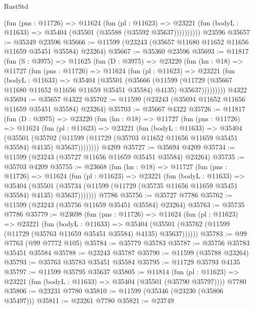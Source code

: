 \begin{lexlean}{RustStd}
\begin{coremodule}
            (fun (pns : @11726) =>
            @11624
              (fun (pl : @11623) =>
              @23221 (fun (bodyL : @11633) => @35404 (@35501 (@35588 (@35592 @35637))))))))))
    @23596
@35657 := @35349 @23596
@35666 := @11599 (@23243 (@35657 @11680 @11652 @11656 @11659 @35451 @35584) @23264)
@35667 := @35360 @23596
@35693 := @11817
    (fun (S : @3975) =>
    @11625
      (fun (D : @3975) =>
      @23220
        (fun (hn : @18) =>
        @11727
          (fun (pns : @11726) =>
          @11624
            (fun (pl : @11623) =>
            @23221
              (fun (bodyL : @11633) =>
              @35404
                (@35501
                  (@35666
                    (@11599
                      (@11729 (@35667 @11680 @11652 @11656 @11659 @35451 @35584) @4135)
                      @35637)))))))))
    @4322
@35694 := @35657 @4322
@35702 := @11599 (@23243 (@35694 @11652 @11656 @11659 @35451 @35584) @23264)
@35703 := @35667 @4322
@35726 := @11817
    (fun (D : @3975) =>
    @23220
      (fun (hn : @18) =>
      @11727
        (fun (pns : @11726) =>
        @11624
          (fun (pl : @11623) =>
          @23221
            (fun (bodyL : @11633) =>
            @35404
              (@35501
                (@35702
                  (@11599 (@11729 (@35703 @11652 @11656 @11659 @35451 @35584) @4135) @35637))))))))
    @4209
@35727 := @35694 @4209
@35734 := @11599 (@23243 (@35727 @11656 @11659 @35451 @35584) @23264)
@35735 := @35703 @4209
@35755 := @23668
    (fun (hn : @18) =>
    @11727
      (fun (pns : @11726) =>
      @11624
        (fun (pl : @11623) =>
        @23221
          (fun (bodyL : @11633) =>
          @35404
            (@35501
              (@35734 (@11599 (@11729 (@35735 @11656 @11659 @35451 @35584) @4135) @35637)))))))
    @7786
@35756 := @35727 @7786
@35762 := @11599 (@23243 (@35756 @11659 @35451 @35584) @23264)
@35763 := @35735 @7786
@35779 := @23698
    (fun (pns : @11726) =>
    @11624
      (fun (pl : @11623) =>
      @23221
        (fun (bodyL : @11633) =>
        @35404 (@35501 (@35762 (@11599 (@11729 (@35763 @11659 @35451 @35584) @4135) @35637))))))
@35783 := @99 @7763 (@99 @7772 @105)
@35784 := @35779 @35783
@35787 := @35756 @35783 @35451 @35584
@35788 := @23243 @35787
@35790 := @11599 (@35788 @23264)
@35793 := @35763 @35783 @35451 @35584
@35795 := @11729 @35793 @4135
@35797 := @11599 @35795 @35637
@35805 := @11814
    (fun (pl : @11623) => @23221 (fun (bodyL : @11633) => @35404 (@35501 (@35790 @35797))))
    @7780
@35806 := @23231 @7780
@35810 := @11599 (@35346 (@23230 (@35806 @35497)))
@35811 := @23261 @7780
@35821 := @23749

\end{coremodule}
\end{lexlean}

